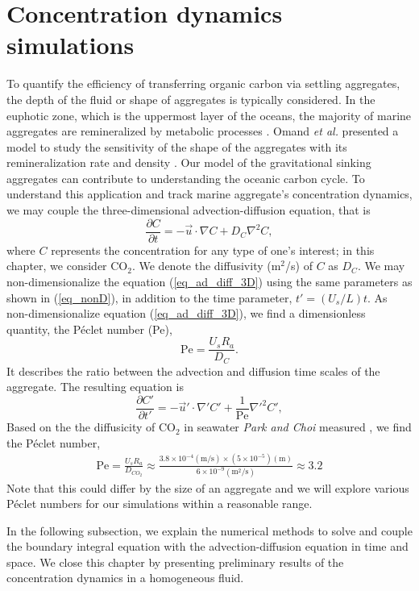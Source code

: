 \section{Concentration dynamics simulations}
\label{sec:concentration}
To quantify the efficiency of transferring organic carbon via settling aggregates, the depth of the fluid or shape of aggregates is typically considered.
In the euphotic zone, which is the uppermost layer of the oceans, the majority of marine aggregates are remineralized by metabolic processes \cite{henson_global_2012}. Omand {\it{et al.}} presented a model to study the sensitivity of the shape of the aggregates with its remineralization rate and density \cite{omand_sinking_2020}. 
Our model of the gravitational sinking aggregates can contribute to understanding the oceanic carbon cycle. 
To understand this application and track marine aggregate's concentration dynamics, we may couple the three-dimensional advection-diffusion equation, that is 
\begin{equation}
	\frac{\partial C }{\partial t} 
	= - \vec{u} \cdot \nabla C
	+ D_{C} \nabla^2 C,
	\label{eq_ad_diff_3D}
\end{equation} 
where $C$ represents the concentration for any type of one's interest; in this chapter, we consider CO$_2$. 
We denote the diffusivity (m$^2$/s) of $C$ as $D_{C}$.
We may non-dimensionalize the equation (\ref{eq_ad_diff_3D}) using the same parameters as shown in (\ref{eq_nonD}), in addition to the time parameter, $t' = \left(U_s/L \right) t$. 
As non-dimensionalize equation (\ref{eq_ad_diff_3D}), 
 we find a dimensionless quantity, the Péclet number (Pe), 
 \begin{equation}
\text{Pe} = \frac{U_s R_a}{D_C}.	
\label{eq_def_Pe}
 \end{equation}
 It describes the ratio between the advection and diffusion time scales of the aggregate.  
 The resulting equation is
\begin{equation}
	\frac{\partial C' }{\partial t'} 
	= - \vec{u}' \cdot \nabla' C'
	+ \frac{1}{\text{Pe}} \nabla'^2 C',
	\label{eq_ad_diff_nonD}
\end{equation}
Based on the the diffusicity of CO$_2$ in seawater \textit{Park and Choi} measured \cite{park_performance_2020}, we find the Péclet number,
\begin{align}
	\text{Pe} 
	= \frac{U_s R_a }{D_{CO_2}} 
	\approx \frac{3.8 \times 10^{-4}(\text{m/s}) \times \left(5 \times 10^{-5} \right) (\text{m})}{6 \times 10^{-9} (\text{m}^2\text{/s})} \approx 3.2
\end{align}
Note that this could differ by the size of an aggregate and we will explore various Péclet numbers for our simulations within a reasonable range. 
\par 
In the following subsection, we explain the numerical methods to solve and couple the boundary integral equation with the advection-diffusion equation in time and space. We close this chapter by presenting preliminary results of the concentration dynamics in a homogeneous fluid. 
